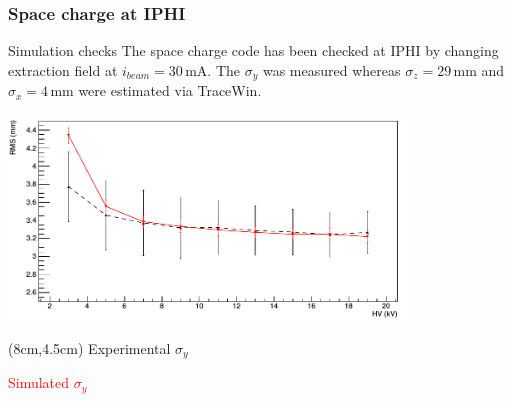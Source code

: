 
\begin{frame}[t]
  \frametitle{Space charge at IPHI}
  \begin{block}{Simulation checks}
    The space charge code has been checked at IPHI by changing extraction field at $i_{beam}=30\,\mathrm{mA}$. The $\sigma_{y}$ was measured whereas  $\sigma_{z}=29\,\mathrm{mm}$ and $\sigma_{x}=4\,\mathrm{mm}$ were estimated via TraceWin.
  \end{block}
  \begin{center}
    \includegraphics[width=0.8\textwidth]{06_Backup/fig/fig000_SC_IPHI_check}
  \end{center}
  \begin{textblock*}{4cm}(8cm,4.5cm)      
    Experimental $\sigma_{y}$
    
    \textcolor{red}{Simulated $\sigma_{y}$}
  \end{textblock*}
\end{frame}

